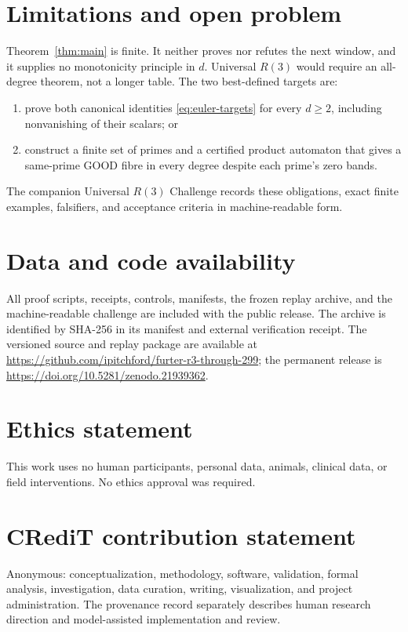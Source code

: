 \documentclass[11pt]{article}
\theoremstyle{definition}
\begin{document}
\section{Limitations and open problem}

Theorem~\ref{thm:main} is finite.  It neither proves nor refutes the next
window, and it supplies no monotonicity principle in $d$.  Universal $R(3)$
would require an all-degree theorem, not a longer table.  The two best-defined
targets are:
\begin{enumerate}
\item prove both canonical identities \eqref{eq:euler-targets} for every
  $d\ge2$, including nonvanishing of their scalars; or
\item construct a finite set of primes and a certified product automaton that
  gives a same-prime GOOD fibre in every degree despite each prime's zero
  bands.
\end{enumerate}
The companion Universal $R(3)$ Challenge records these obligations, exact
finite examples, falsifiers, and acceptance criteria in machine-readable
form.

\section*{Data and code availability}

All proof scripts, receipts, controls, manifests, the frozen replay archive,
and the machine-readable challenge are included with the public release.  The
archive is identified by SHA-256 in its manifest and external verification
receipt.  The versioned source and replay package are available at
\url{https://github.com/ipitchford/furter-r3-through-299}; the permanent
release is \url{https://doi.org/10.5281/zenodo.21939362}.

\section*{Ethics statement}

This work uses no human participants, personal data, animals, clinical data,
or field interventions.  No ethics approval was required.

\section*{CRediT contribution statement}

Anonymous: conceptualization, methodology, software, validation, formal
analysis, investigation, data curation, writing, visualization, and project
administration.  The provenance record separately describes human research
direction and model-assisted implementation and review.
\end{document}
